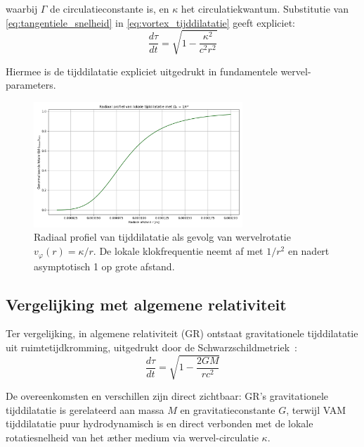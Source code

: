 waarbij $\Gamma$ de circulatieconstante is, en $\kappa$ het circulatiekwantum. Substitutie van \eqref{eq:tangentiele_snelheid} in \eqref{eq:vortex_tijddilatatie} geeft expliciet:
\begin{equation}\label{eq:vortex_tijd_expliciet}
    \frac{d\tau}{dt} = \sqrt{1 - \frac{\kappa^2}{c^2 r^2}}
\end{equation}

Hiermee is de tijddilatatie expliciet uitgedrukt in fundamentele wervel-parameters.

\begin{figure}[H]
  \centering
  \includegraphics[width=0.7\textwidth]{images/02-RadialProfileOfLocalTimeDilation_Radial_LocalTime_Dilation_nl}
  \caption{Radiaal profiel van tijddilatatie als gevolg van wervelrotatie \( v_\varphi(r) = \kappa / r \). De lokale klokfrequentie neemt af met \(1/r^2\) en nadert asymptotisch 1 op grote afstand.}
  \label{fig:radiale_tijddilatatie}
\end{figure}


\subsection{Vergelijking met algemene relativiteit}

Ter vergelijking, in algemene relativiteit (GR) ontstaat gravitationele tijddilatatie uit ruimtetijdkromming, uitgedrukt door de Schwarzschildmetriek~\cite{schutz2009first}:
\begin{equation}\label{eq:GRtijd}
    \frac{d\tau}{dt} = \sqrt{1 - \frac{2GM}{rc^2}}
\end{equation}


De overeenkomsten en verschillen zijn direct zichtbaar: GR's gravitationele tijddilatatie is gerelateerd aan massa $M$ en gravitatieconstante $G$, terwijl VAM tijddilatatie puur hydrodynamisch is en direct verbonden met de lokale rotatiesnelheid van het æther medium via wervel-circulatie $\kappa$.

